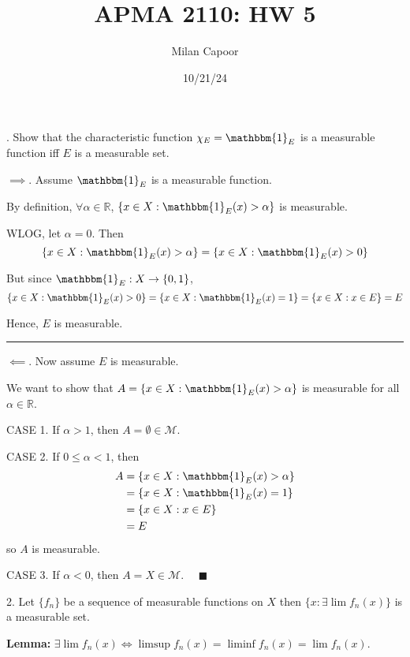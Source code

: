 \documentclass[12pt]{article}
\title{APMA 2110: HW 5}
\author{Milan Capoor}
\date{10/21/24}
\newcommand{\R}{\mathbb{R}}
\newcommand{\ind}{\mathbbm{1}}
\newcommand{\qed}{\quad \blacksquare}
\newcommand{\M}{\mathcal{M}}
\newcommand{\X}{\chi}
\renewcommand{\div}{\vspace*{10pt}\hrule\vspace*{10pt}}
\newcommand*{\tbf}[1]{\ifmmode\mathbf{#1}\else\textbf{#1}\fi}
\begin{document}
. Show that the characteristic function $\X_E = \ind_E$ is a measurable function iff $E$ is a measurable set.

\color{blue}
    $\implies$. Assume $\ind_E$ is a measurable function. 

    By definition, $\forall \alpha \in \R$, $\{x \in X: \ind_E(x) > \alpha\}$ is measurable.

    WLOG, let $\alpha = 0$. Then 
    \[\{x \in X: \ind_E(x) > \alpha\} = \{x \in X: \ind_E(x) > 0\}\]

    But since $\ind_E: X \to \{0, 1\}$,
    \[\{x \in X: \ind_E(x) > 0\} = \{x \in X: \ind_E(x) = 1\} = \{x \in X: x \in E\} = E\]

    Hence, $E$ is measurable. 

    \div

    $\impliedby$. Now assume $E$ is measurable. 

    We want to show that $A = \{x \in X: \ind_E(x) > \alpha\}$ is measurable for all $\alpha \in \R$. 

    CASE 1. If $\alpha > 1$, then $A = \emptyset \in \M$. 

    CASE 2. If $0 \leq \alpha < 1$, then 
    \begin{align*}
        A &= \{x \in X: \ind_E(x) > \alpha\} \\
        &= \{x \in X: \ind_E(x) = 1\} \\
        &= \{x \in X: x \in E\} \\
        &= E
    \end{align*}
    so $A$ is measurable. 

    CASE 3. If $\alpha <0$, then $A = X \in \M$. $\qed$
    
\color{black}



\pagebreak

2. Let $\{f_n\}$ be a sequence of measurable functions on $X$ then $\{x : \exists\lim f_n(x)\}$ is a measurable set.

    \color{blue}
        \tbf{Lemma:} $\exists \lim f_n(x) \iff \limsup f_n(x) = \liminf f_n(x) = \lim f_n(x)$. 
\end{document}

